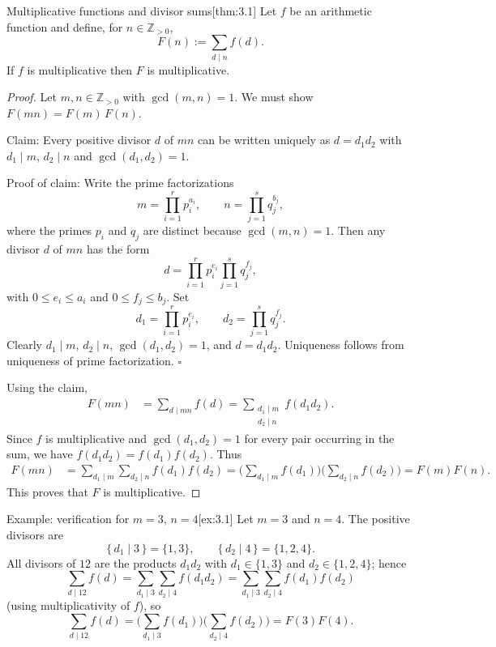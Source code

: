 \documentclass[10pt]{article}
\theoremstyle{definition}
\theoremstyle{plain}
\numberwithin{equation}{section}
\begin{document}
\begin{define}{Multiplicative functions and divisor sums}[thm:3.1]
Let $f$ be an arithmetic function and define, for $n\in\mathbb{Z}_{>0}$,
\[
F(n):=\sum_{d\mid n} f(d).
\]
If $f$ is multiplicative then $F$ is multiplicative.
\end{define}

\begin{proof}
Let $m,n\in\mathbb{Z}_{>0}$ with $\gcd(m,n)=1$. We must show $F(mn)=F(m)\,F(n)$.

Claim: Every positive divisor $d$ of $mn$ can be written uniquely as $d=d_1d_2$ with $d_1\mid m$, $d_2\mid n$ and $\gcd(d_1,d_2)=1$.

Proof of claim: Write the prime factorizations
\[
m=\prod_{i=1}^r p_i^{a_i},\qquad n=\prod_{j=1}^s q_j^{b_j},
\]
where the primes $p_i$ and $q_j$ are distinct because $\gcd(m,n)=1$. Then any divisor $d$ of $mn$ has the form
\[
d=\prod_{i=1}^r p_i^{e_i}\prod_{j=1}^s q_j^{f_j},
\]
with $0\le e_i\le a_i$ and $0\le f_j\le b_j$. Set
\[
d_1=\prod_{i=1}^r p_i^{e_i},\qquad d_2=\prod_{j=1}^s q_j^{f_j}.
\]
Clearly $d_1\mid m$, $d_2\mid n$, $\gcd(d_1,d_2)=1$, and $d=d_1d_2$. Uniqueness follows from uniqueness of prime factorization. $\square$

Using the claim,
\[
\begin{aligned}
F(mn)
&= \sum_{d\mid mn} f(d)
= \sum_{\substack{d_1\mid m\\ d_2\mid n}} f(d_1d_2).
\end{aligned}
\]
Since $f$ is multiplicative and $\gcd(d_1,d_2)=1$ for every pair occurring in the sum, we have $f(d_1d_2)=f(d_1)f(d_2)$. Thus
\[
\begin{aligned}
F(mn)
&= \sum_{d_1\mid m}\sum_{d_2\mid n} f(d_1)f(d_2)
= \Big(\sum_{d_1\mid m} f(d_1)\Big)\Big(\sum_{d_2\mid n} f(d_2)\Big)
=F(m)F(n).
\end{aligned}
\]
This proves that $F$ is multiplicative.
\end{proof}

\begin{define}{Example: verification for $m=3$, $n=4$}[ex:3.1]
Let $m=3$ and $n=4$. The positive divisors are
\[
\{\,d_1\mid 3\,\}=\{1,3\},\qquad \{\,d_2\mid 4\,\}=\{1,2,4\}.
\]
All divisors of $12$ are the products $d_1d_2$ with $d_1\in\{1,3\}$ and $d_2\in\{1,2,4\}$; hence
\[
\sum_{d\mid 12} f(d)
= \sum_{d_1\mid 3}\sum_{d_2\mid 4} f(d_1d_2)
= \sum_{d_1\mid 3}\sum_{d_2\mid 4} f(d_1)f(d_2)
\]
(using multiplicativity of $f$), so
\[
\sum_{d\mid 12} f(d)
= \Big(\sum_{d_1\mid 3} f(d_1)\Big)\Big(\sum_{d_2\mid 4} f(d_2)\Big)
=F(3)F(4).
\]
\end{define}
\end{document}
